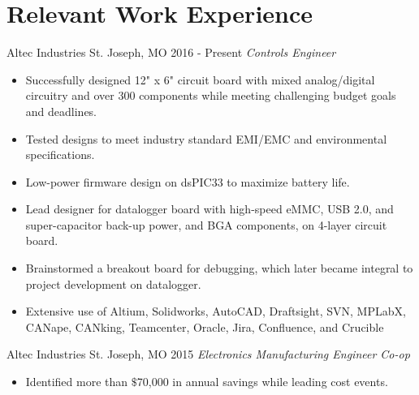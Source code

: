 \documentclass[]{bergman-cv} %
\begin{document}
\section{Relevant Work Experience}
\begin{entrylist}
\entry
{Altec Industries}
{St. Joseph, MO}
{2016 - Present}
{\emph{Controls Engineer}}
{\begin{itemize}	\setlength\itemsep{0.25em} \vspace*{-5pt}
	\item Successfully designed 12" x 6" circuit board with mixed analog/digital circuitry and over 300 components while meeting challenging budget goals and deadlines.
	
	
	\item Tested designs to meet industry standard EMI/EMC and environmental specifications.
	\item Low-power firmware design on dsPIC33 to maximize battery life.
	\item Lead designer for datalogger board with high-speed eMMC, USB 2.0, and super-capacitor back-up power, and BGA components, on 4-layer circuit board.
	\item Brainstormed a breakout board for debugging, which later became integral to project development on datalogger.
	\item Extensive use of Altium, Solidworks, AutoCAD, Draftsight, SVN, MPLabX, CANape, CANking, Teamcenter, Oracle, Jira, Confluence, and Crucible
\end{itemize}}
\vspace{6pt}
\entry
{Altec Industries}
{St. Joseph, MO}
{2015}
{\emph{Electronics Manufacturing Engineer Co-op}}
{\begin{itemize}	\setlength\itemsep{0.25em} \vspace*{-5pt}
	\item Identified more than $\$$70,000 in annual savings while leading cost events.


\end{itemize}}
\end{entrylist}
\end{document}
